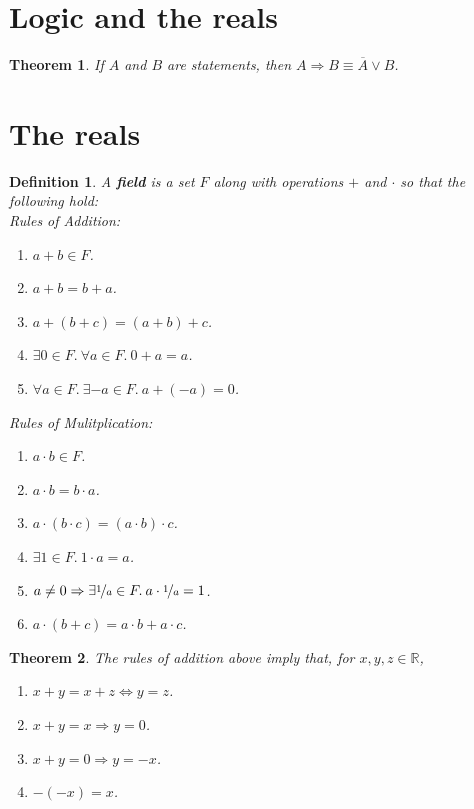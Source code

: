 \documentclass{article}
\theoremstyle{sltheorem}
\newtheorem{definition}{Definition}[section]
\newtheorem{theorem}{Theorem}[section]
\newcommand{\R}{\mathbb{R}}
\newcommand*\lneg[1]{\overline{#1}}
\newcommand*\B[1]{\textbf{#1}}
\begin{document}
\section{Logic and the reals}
\begin{theorem}
    If $A$ and $B$ are statements, then $A\Rightarrow B\equiv \lneg{A}\vee B$.
\end{theorem}
\section{The reals}
\begin{definition}
    A \B{field} is a set $F$ along with operations $+$ and $\cdot$ so that the following hold:\\
    Rules of Addition:
    \begin{enumerate}
        \item $a+b\in F$.
        \item $a+b = b+a$.
        \item $a+(b+c) = (a+b)+c$.
        \item $\exists 0\in F.\: \forall a\in F.\: 0+a=a$.
        \item $\forall a\in F.\: \exists -a\in F.\: a+(-a)=0$.
    \end{enumerate}
    Rules of Mulitplication:
    \begin{enumerate}
        \item $a\cdot b \in F$.
        \item $a\cdot b = b\cdot a$.
        \item $a\cdot(b\cdot c)=(a\cdot b)\cdot c$.
        \item $\exists 1\in F.\: 1\cdot a = a$.
        \item $a\not=0\Rightarrow\exists \nicefrac{1}{a}\in F.\: a\cdot\nicefrac{1}{a}=1$.
        \item $a\cdot (b+c) = a\cdot b + a\cdot c$.
    \end{enumerate}
\end{definition}
\begin{theorem}
    The rules of addition above imply that, for $x,y,z\in \R$,
    \begin{enumerate}
        \item $x+y=x+z\Leftrightarrow y=z$.
        \item $x+y=x\Rightarrow y=0$.
        \item $x+y=0\Rightarrow y=-x$.
        \item $-(-x)=x$.
    \end{enumerate}
\end{theorem}
\end{document}
